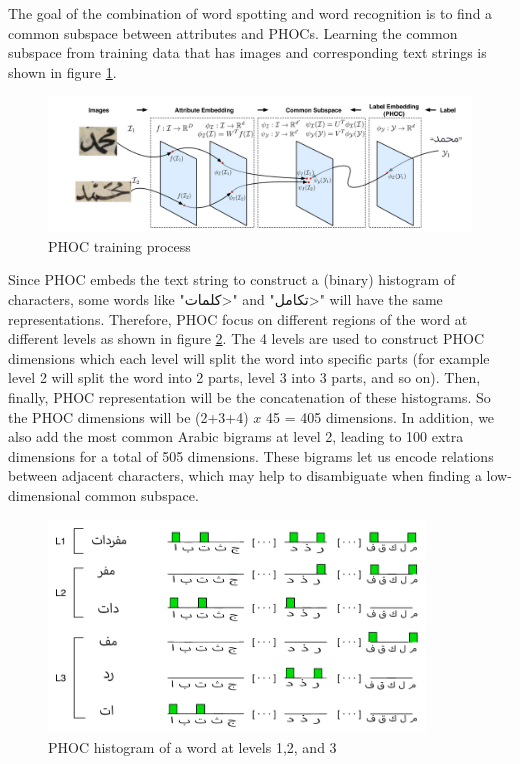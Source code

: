 \noindent
The goal of the combination of word spotting and word recognition is to find a common subspace between attributes and PHOCs. Learning the common subspace from training data that has images and corresponding text strings is shown in figure \ref{fig:phoc_common_subspace}. \\

\begin{figure}[!htb]
    \centering
    \includegraphics[width=15cm]{images/phoc-common-subspace.png}
    \caption{PHOC training process}
    \label{fig:phoc_common_subspace}
\end{figure}

Since PHOC embeds the text string to construct a (binary) histogram of characters, some words like "\<كلمات>" and "\<تكامل>" will have the same representations. Therefore, PHOC focus on different regions of the word at different levels as shown in figure \ref{fig:phoc_histogram}. The 4 levels are used to construct PHOC dimensions which each level will split the word into specific parts (for example level 2 will split the word into 2 parts, level 3 into 3 parts, and so on). Then, finally, PHOC representation will be the concatenation of these histograms. So the PHOC dimensions will be (2+3+4) $x$ 45 = 405 dimensions. In addition, we also add the most common Arabic bigrams at level 2, leading to 100 extra dimensions for a total of 505 dimensions. These bigrams let us encode relations between adjacent characters, which may help to disambiguate when finding a low-dimensional common subspace.

\begin{figure}[!htb]
    \centering
    \includegraphics[width=10cm]{images/phoc_representation-arabic.png}
    \caption{PHOC histogram of a word at levels 1,2, and 3}
    \label{fig:phoc_histogram}
\end{figure}

